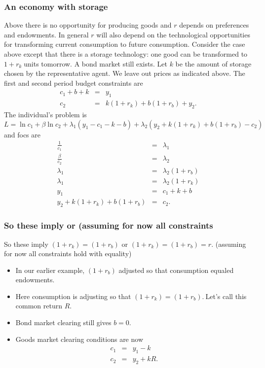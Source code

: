 \documentclass[aspectratio=169]{ltx-talk}
\begin{document}
\begin{frame}
\frametitle{An economy with storage}
Above there is no opportunity for producing goods and $r$ depends on
preferences and endowments. In general $r$ will also depend on the
technological opportunities for transforming current consumption to future
consumption. Consider the case above except that there is a storage
technology: one good can be transformed to $1+r_{k}\;$units tomorrow. A bond
market still exists. Let $k$ be the amount of storage chosen by the
representative agent. We leave out prices as indicated above. The first and
second period budget constraints are 
\begin{eqnarray*}
c_{1}+b+k &=&y_{1} \\
c_{2} &=&k\left( 1+r_{k}\right) +b\left( 1+r_{b}\right) +y_{2}.
\end{eqnarray*}%
The individual's problem is%
\begin{equation*}
L=\ln c_{1}+\beta \ln c_{2}+\lambda _{1}\left( y_{1}-c_{1}-k-b\right)
+\lambda _{2}\left( y_{2}+k\left( 1+r_{k}\right) +b\left( 1+r_{b}\right)
-c_{2}\right)
\end{equation*}%
and focs are 
\begin{eqnarray*}
\frac{1}{c_{1}} &=&\lambda _{1} \\
\frac{\beta }{c_{2}} &=&\lambda _{2} \\
\lambda _{1} &=&\lambda _{2}\left( 1+r_{b}\right) \\
\lambda _{1} &=&\lambda _{2}\left( 1+r_{k}\right) \\
y_{1} &=&c_{1}+k+b \\
y_{2}+k\left( 1+r_{k}\right) +b\left( 1+r_{b}\right) &=&c_{2}.
\end{eqnarray*}
\end{frame}

\begin{frame}
\frametitle{So these imply or (assuming for now all constraints}
So these imply $\left( 1+r_{k}\right) =\left( 1+r_{b}\right) $ or $\left(
1+r_{k}\right) =\left( 1+r_{b}\right) =r.$ (assuming for now all constraints
hold with equality)

\begin{itemize}
\item In our earlier example, $\left( 1+r_{b}\right) $ adjusted so that
consumption equaled endowments.

\item Here consumption is adjusting so that $\left( 1+r_{k}\right) =\left(
1+r_{b}\right) .\ $Let's call this common return $R$.

\item Bond market clearing still gives $b=0.$

\item Goods market clearing conditions are now 
\begin{eqnarray*}
c_{1} &=&y_{1}-k \\
c_{2} &=&y_{2}+kR.
\end{eqnarray*}%
\end{itemize}
\end{frame}
\end{document}
